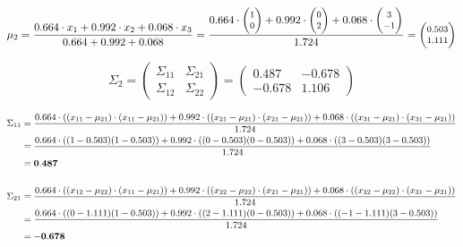 \documentclass[12pt]{article}
\begin{document}
\begin{enumerate}
    \begin{equation*}
        \fontsize{8pt}{10pt}\selectfont
        \mu_2 = \frac{0.664 \cdot x_1 + 0.992 \cdot x_2 + 0.068 \cdot x_3}{0.664+0.992+0.068} = \frac{0.664 \cdot \begin{pmatrix}
        1\\
        0
        \end{pmatrix}+ 0.992 \cdot \begin{pmatrix}
        0\\
        2
        \end{pmatrix} + 0.068 \cdot \begin{pmatrix}
        3\\
        -1
        \end{pmatrix}}{1.724} = \begin{pmatrix}
        0.503\\
        1.111
        \end{pmatrix}
    \end{equation*}

    \begin{equation*}
        \Sigma_2 = \begin{pmatrix}
            \Sigma_{11} & \Sigma_{21} \\
            \Sigma_{12} & \Sigma_{22}
        \end{pmatrix} = \begin{pmatrix}
            0.487 & -0.678\\
            -0.678 & 1.106
        \end{pmatrix}
    \end{equation*}

    \begin{equation*}
        \fontsize{9pt}{10pt}\selectfont
        \begin{aligned}
            \Sigma_{11} &= \frac{0.664 \cdot ((x_{11}-\mu_{21}) \cdot (x_{11} - \mu_{21}))+ 0.992 \cdot ((x_{21}-\mu_{21}) \cdot (x_{21} - \mu_{21}))+ 0.068 \cdot ((x_{31}-\mu_{21}) \cdot (x_{31} - \mu_{21}))}{1.724}\\
            &=\frac{0.664 \cdot ((1-0.503)(1-0.503)) + 0.992 \cdot ((0-0.503)(0-0.503))+ 0.068 \cdot ((3-0.503)(3-0.503))}{1.724} \\
            &= \mathbf{0.487}\\
            \\
            \Sigma_{21} &= \frac{0.664 \cdot ((x_{12}-\mu_{22}) \cdot (x_{11} - \mu_{21}))+ 0.992 \cdot ((x_{22}-\mu_{22}) \cdot (x_{21} - \mu_{21}))+ 0.068 \cdot ((x_{32}-\mu_{22}) \cdot (x_{31} - \mu_{21}))}{1.724}\\
            &=\frac{0.664 \cdot ((0-1.111)(1-0.503)) + 0.992 \cdot ((2-1.111)(0-0.503)) + 0.068 \cdot ((-1-1.111)(3-0.503))}{1.724} \\
            &= \mathbf{-0.678}\\
            \\
        \end{aligned}
    \end{equation*}


\end{enumerate}
\end{document}
